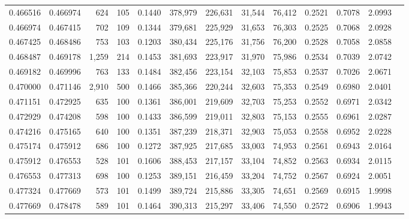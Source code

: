 \begin{tabular}{rrrrrrrrrrrrr}
0.466516 & 0.466974 &   624 & 105 &                                     0.1440 & 378,979 & 226,631 &  31,544 &  76,412 & 0.2521 & 0.7078 & 2.0993 \\
0.466974 & 0.467415 &   702 & 109 &                                     0.1344 & 379,681 & 225,929 &  31,653 &  76,303 & 0.2525 & 0.7068 & 2.0928 \\
0.467425 & 0.468486 &   753 & 103 &                                     0.1203 & 380,434 & 225,176 &  31,756 &  76,200 & 0.2528 & 0.7058 & 2.0858 \\
0.468487 & 0.469178 & 1,259 & 214 &                                     0.1453 & 381,693 & 223,917 &  31,970 &  75,986 & 0.2534 & 0.7039 & 2.0742 \\
0.469182 & 0.469996 &   763 & 133 &                                     0.1484 & 382,456 & 223,154 &  32,103 &  75,853 & 0.2537 & 0.7026 & 2.0671 \\
0.470000 & 0.471146 & 2,910 & 500 &                                     0.1466 & 385,366 & 220,244 &  32,603 &  75,353 & 0.2549 & 0.6980 & 2.0401 \\
0.471151 & 0.472925 &   635 & 100 &                                     0.1361 & 386,001 & 219,609 &  32,703 &  75,253 & 0.2552 & 0.6971 & 2.0342 \\
0.472929 & 0.474208 &   598 & 100 &                                     0.1433 & 386,599 & 219,011 &  32,803 &  75,153 & 0.2555 & 0.6961 & 2.0287 \\
0.474216 & 0.475165 &   640 & 100 &                                     0.1351 & 387,239 & 218,371 &  32,903 &  75,053 & 0.2558 & 0.6952 & 2.0228 \\
0.475174 & 0.475912 &   686 & 100 &                                     0.1272 & 387,925 & 217,685 &  33,003 &  74,953 & 0.2561 & 0.6943 & 2.0164 \\
0.475912 & 0.476553 &   528 & 101 &                                     0.1606 & 388,453 & 217,157 &  33,104 &  74,852 & 0.2563 & 0.6934 & 2.0115 \\
0.476553 & 0.477313 &   698 & 100 &                                     0.1253 & 389,151 & 216,459 &  33,204 &  74,752 & 0.2567 & 0.6924 & 2.0051 \\
0.477324 & 0.477669 &   573 & 101 &                                     0.1499 & 389,724 & 215,886 &  33,305 &  74,651 & 0.2569 & 0.6915 & 1.9998 \\
0.477669 & 0.478478 &   589 & 101 &                                     0.1464 & 390,313 & 215,297 &  33,406 &  74,550 & 0.2572 & 0.6906 & 1.9943 \\

\end{tabular}
